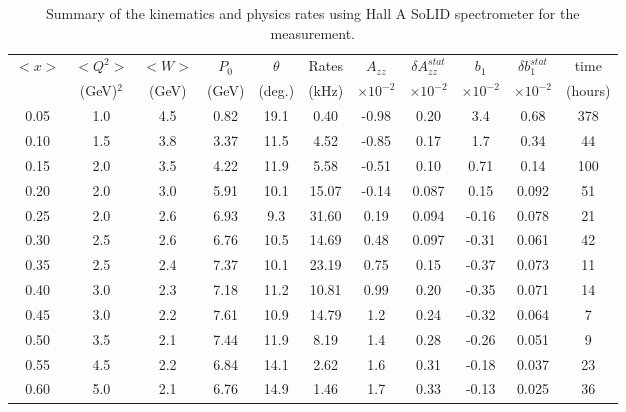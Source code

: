\begin{table}
\begin{center}
\caption{\label{solidRATES}Summary of the kinematics and physics rates using Hall A SoLID spectrometer for the measurement.}
\begin{tabular}{|ccc|cc|c|cc|cc|c|}\hline
 $<x>$  & $<Q^2>$      &  $<W>$  &    $P_0$    &    $\theta$  &  Rates & $A_{zz}$ & $\delta A_{zz}^{stat}$    & $b_1$  & $\delta b_1^{stat}$ & time   \\
  ~     & (GeV)$^2$  & (GeV) & (GeV)  &     (deg.)  &   (kHz)  & $\times 10^{-2}$ & $\times 10^{-2}$ &  $\times 10^{-2}$ & $\times 10^{-2}$    & (hours) \\
\hline\hline
 0.05 &   1.0 &    4.5 &   0.82 &   19.1 &   0.40 & -0.98 &  0.20 &  3.4  & 0.68  &   378 \\
 0.10 &   1.5 &    3.8 &   3.37 &   11.5 &   4.52 & -0.85 &  0.17 &  1.7  & 0.34  &    44 \\
 0.15 &   2.0 &    3.5 &   4.22 &   11.9 &   5.58 & -0.51 &  0.10 &  0.71 & 0.14  &   100 \\
 0.20 &   2.0 &    3.0 &   5.91 &   10.1 &  15.07 & -0.14 & 0.087 &  0.15 & 0.092 &    51 \\
 0.25 &   2.0 &    2.6 &   6.93 &    9.3 &  31.60 &  0.19 & 0.094 & -0.16 & 0.078 &    21 \\
 0.30 &   2.5 &    2.6 &   6.76 &   10.5 &  14.69 &  0.48 & 0.097 & -0.31 & 0.061 &    42 \\
 0.35 &   2.5 &    2.4 &   7.37 &   10.1 &  23.19 &  0.75 &  0.15 & -0.37 & 0.073 &    11 \\
 0.40 &   3.0 &    2.3 &   7.18 &   11.2 &  10.81 &  0.99 &  0.20 & -0.35 & 0.071 &    14 \\
 0.45 &   3.0 &    2.2 &   7.61 &   10.9 &  14.79 &  1.2  &  0.24 & -0.32 & 0.064 &     7 \\
 0.50 &   3.5 &    2.1 &   7.44 &   11.9 &   8.19 &  1.4  &  0.28 & -0.26 & 0.051 &     9 \\
 0.55 &   4.5 &    2.2 &   6.84 &   14.1 &   2.62 &  1.6  &  0.31 & -0.18 & 0.037 &    23 \\
 0.60 &   5.0 &    2.1 &   6.76 &   14.9 &   1.46 &  1.7  &  0.33 & -0.13 & 0.025 &    36 \\
\hline\hline
\end{tabular}
\end{center}
\end{table}

